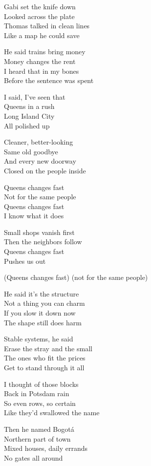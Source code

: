 \begin{lyrics}
Gabi set the knife down\\
Looked across the plate\\
Thomas talked in clean lines\\
Like a map he could save

He said trains bring money\\
Money changes the rent\\
I heard that in my bones\\
Before the sentence was spent

I said, I’ve seen that\\
Queens in a rush\\
Long Island City\\
All polished up

Cleaner, better-looking\\
Same old goodbye\\
And every new doorway\\
Closed on the people inside

Queens changes fast\\
Not for the same people\\
Queens changes fast\\
I know what it does

Small shops vanish first\\
Then the neighbors follow\\
Queens changes fast\\
Pushes us out

(Queens changes fast)
(not for the same people)

He said it’s the structure\\
Not a thing you can charm\\
If you slow it down now\\
The shape still does harm

Stable systems, he said\\
Erase the stray and the small\\
The ones who fit the prices\\
Get to stand through it all

I thought of those blocks\\
Back in Potsdam rain\\
So even rows, so certain\\
Like they’d swallowed the name

Then he named Bogotá\\
Northern part of town\\
Mixed houses, daily errands\\
No gates all around


\end{lyrics}
